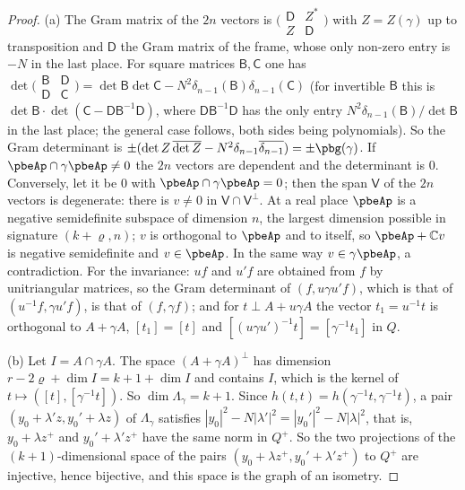 \documentclass[10pt]{amsart}
\theoremstyle{definition}
\theoremstyle{remark}
\newcommand{\C}{\mathbb C}
\newcommand{\Z}{\mathbb Z}
\providecommand{\aubar}[1]{\overline{#1}}
\begin{document}
\begin{proof}
(a) The Gram matrix of the $2n$ vectors is $\bigl(\begin{smallmatrix}\mathsf D&Z^*\\Z&\mathsf D
\end{smallmatrix}\bigr)$ with $Z=Z(\gamma)$ up to transposition and $\mathsf D$ the Gram matrix of
the frame, whose only non-zero entry is $-N$ in the last place. For square matrices $\mathsf B,
\mathsf C$ one has $\det\bigl(\begin{smallmatrix}\mathsf B&\mathsf D\\\mathsf D&\mathsf C
\end{smallmatrix}\bigr)=\det\mathsf B\det\mathsf C-N^2\delta_{n-1}(\mathsf B)\delta_{n-1}(\mathsf C)$
(for invertible $\mathsf B$ this is $\det\mathsf B\cdot\det(\mathsf C-\mathsf D\mathsf B^{-1}\mathsf
D)$, where $\mathsf D\mathsf B^{-1}\mathsf D$ has the only entry $N^2\delta_{n-1}(\mathsf B)/\det
\mathsf B$ in the last place; the general case follows, both sides being polynomials). So the Gram
determinant is $\pm(\det Z\,\aubar{\det Z}-N^2\delta_{n-1}\aubar{\delta_{n-1}})=\pm\pbg(\gamma)$. If $\pbeAp\cap\gamma\pbeAp\ne0$ the $2n$ vectors are dependent and
the determinant is $0$. Conversely, let it be $0$ with $\pbeAp\cap\gamma\pbeAp=0$; then the span
$\mathsf V$ of the $2n$ vectors is degenerate: there is $v\ne0$ in $\mathsf V\cap\mathsf V^\perp$.
At a real place $\pbeAp$ is a negative semidefinite subspace of dimension $n$, the largest
dimension possible in signature $(k+\varrho,n)$; $v$ is orthogonal to $\pbeAp$ and to itself, so
$\pbeAp+\C v$ is negative semidefinite and $v\in\pbeAp$. In the same way $v\in\gamma\pbeAp$, a
contradiction. For the invariance: $uf$ and $u'f$ are obtained from $f$ by unitriangular matrices,
so the Gram determinant of $(f,u\gamma u'f)$, which is that of $(u^{-1}f,\gamma u'f)$, is that of
$(f,\gamma f)$; and for $t\perp A+u\gamma A$ the vector $t_1=u^{-1}t$ is orthogonal to $A+\gamma A$,
$[t_1]=[t]$ and $[(u\gamma u')^{-1}t]=[\gamma^{-1}t_1]$ in $Q$.

(b) Let $I=A\cap\gamma A$. The space $(A+\gamma A)^\perp$ has dimension $r-2\varrho+\dim I=k+1+\dim
I$ and contains $I$, which is the kernel of $t\mapsto([t],[\gamma^{-1}t])$. So $\dim\Lambda_\gamma=k+1$.
Since $h(t,t)=h(\gamma^{-1}t,\gamma^{-1}t)$, a pair $(y_0+\lambda'z,y_0'+\lambda z)$ of $\Lambda_\gamma$
satisfies $|y_0|^2-N|\lambda'|^2=|y_0'|^2-N|\lambda|^2$, that is, $y_0+\lambda z^+$ and $y_0'+\lambda'
z^+$ have the same norm in $Q^+$. So the two projections of the $(k+1)$-dimensional space of the
pairs $(y_0+\lambda z^+,y_0'+\lambda'z^+)$ to $Q^+$ are injective, hence bijective, and this space is
the graph of an isometry.


\end{proof}
\end{document}
